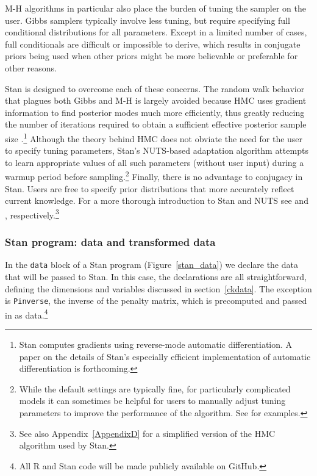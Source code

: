 M-H algorithms in particular also place the 
burden of tuning the sampler on the user. Gibbs samplers typically involve less tuning, but require 
specifying full conditional distributions for all parameters. Except in a limited number of cases, full 
conditionals are difficult or impossible to derive, which results in conjugate priors being used when 
other priors might be more believable or preferable for other reasons. 

Stan is designed to overcome each of these concerns. The random walk behavior that plagues both 
Gibbs and M-H is largely avoided because HMC uses gradient information to find posterior modes 
much more efficiently, thus greatly reducing the number of iterations required to obtain a sufficient 
effective posterior sample size .\footnote{Stan computes gradients using 
reverse-mode automatic differentiation. A paper on the details of Stan's especially efficient 
implementation of automatic differentiation is forthcoming.}  Although the theory behind HMC does 
not obviate the need for the user to specify tuning parameters, Stan's NUTS-based adaptation algorithm 
attempts to learn appropriate values of all such parameters (without user input) during a warmup 
period before sampling.\footnote{While the default settings are typically fine, for particularly complicated 
models it can sometimes be helpful for users to manually adjust tuning parameters to improve the 
performance of the algorithm. See  for examples.} 
Finally, there is no advantage to conjugacy in Stan. 
Users are free to specify prior distributions that more accurately reflect current knowledge. 
For a more thorough introduction to Stan and NUTS see  
and , respectively.\footnote{See also Appendix~\ref{AppendixD} for a simplified 
version of the HMC algorithm used by Stan.}

\subsubsection{Stan program: data and transformed data}

In the {\tt data} block of a Stan program (Figure~\ref{stan_data}) we declare the data that will 
be passed to Stan. In this case, the declarations are all straightforward, defining the dimensions 
and variables discussed in section~\ref{ckdata}. The exception is {\tt Pinverse}, the inverse of 
the penalty matrix, which is precomputed and passed in as data.\footnote{All R and Stan code 
will be made publicly available on GitHub.}

